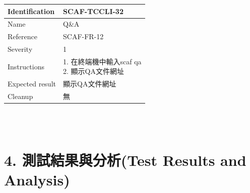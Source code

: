\documentclass{report}
\begin{document}
\begin{tabularx}{\textwidth}{
  |p{}%
  |p{}|%
  }
  \hline
  \centering Identification &  SCAF-TCCLI-32 \\
  \hline
  \centering Name & Q\&A \\
  \hline
  \centering Reference & SCAF-FR-12 \\
  \hline
  \centering Severity & 1 \\
  \hline
  \centering Instructions & 
  \makecell[l]{
    1. 在終端機中輸入scaf qa \\
    2. 顯示QA文件網址 \\
  }\\
  \hline
  \centering Expected result & 顯示QA文件網址 \\
  \hline
  \centering Cleanup & 無 \\
  \hline
\end{tabularx}
\\
\newline
\\
\section*{4. 測試結果與分析(Test Results and Analysis)}
\end{document}
